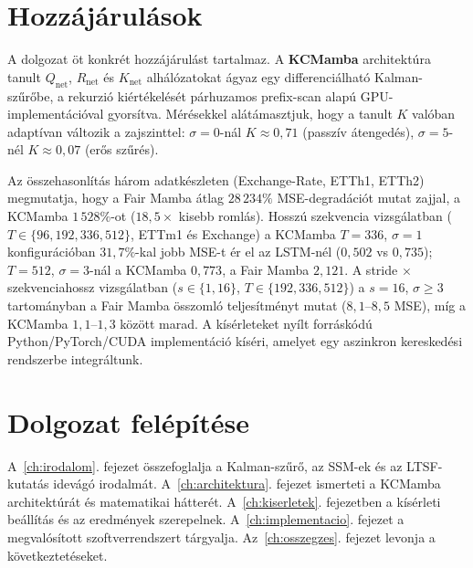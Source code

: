 \section{Hozzájárulások}

A dolgozat öt konkrét hozzájárulást tartalmaz.
A \textbf{KCMamba} architektúra tanult $Q_\text{net}$, $R_\text{net}$ és
$K_\text{net}$ alhálózatokat ágyaz egy differenciálható Kalman-szűrőbe,
a rekurzió kiértékelését párhuzamos prefix-scan alapú GPU-implementációval
gyorsítva. Mérésekkel alátámasztjuk, hogy a tanult $K$ valóban adaptívan
változik a zajszinttel: $\sigma=0$-nál $K \approx 0{,}71$ (passzív átengedés),
$\sigma=5$-nél $K \approx 0{,}07$ (erős szűrés).

Az összehasonlítás három adatkészleten (Exchange-Rate, ETTh1, ETTh2)
megmutatja, hogy a Fair Mamba átlag $28\,234\%$ MSE-degradációt mutat zajjal,
a KCMamba $1\,528\%$-ot ($18{,}5\times$ kisebb romlás).
Hosszú szekvencia vizsgálatban ($T \in \{96, 192, 336, 512\}$,
ETTm1 és Exchange) a KCMamba $T{=}336$, $\sigma{=}1$ konfigurációban
$31{,}7\%$-kal jobb MSE-t ér el az LSTM-nél ($0{,}502$ vs $0{,}735$);
$T{=}512$, $\sigma{=}3$-nál a KCMamba $0{,}773$, a Fair Mamba $2{,}121$.
A stride $\times$ szekvenciahossz vizsgálatban ($s \in \{1, 16\}$,
$T \in \{192, 336, 512\}$) a $s{=}16$, $\sigma{\geq}3$ tartományban
a Fair Mamba összomló teljesítményt mutat ($8{,}1$--$8{,}5$ MSE),
míg a KCMamba $1{,}1$--$1{,}3$ között marad.
A kísérleteket nyílt forráskódú Python/PyTorch/CUDA implementáció kíséri,
amelyet egy aszinkron kereskedési rendszerbe integráltunk.

\section{Dolgozat felépítése}

A~\ref{ch:irodalom}. fejezet összefoglalja a Kalman-szűrő, az SSM-ek és
az LTSF-kutatás idevágó irodalmát.
A~\ref{ch:architektura}. fejezet ismerteti a KCMamba architektúrát
és matematikai hátterét.
A~\ref{ch:kiserletek}. fejezetben a kísérleti beállítás és az eredmények
szerepelnek.
A~\ref{ch:implementacio}. fejezet a megvalósított szoftverrendszert
tárgyalja.
Az~\ref{ch:osszegzes}. fejezet levonja a következtetéseket.
